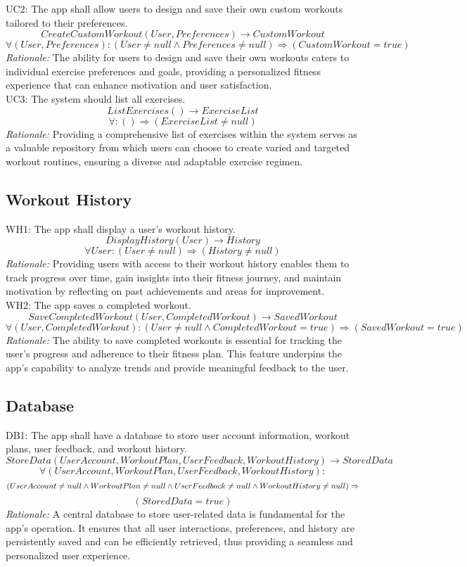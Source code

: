 \documentclass[12pt]{article}
\begin{document}
UC2: The app shall allow users to design and save their own custom workouts tailored to their preferences.
\[CreateCustomWorkout(User, Preferences) \rightarrow CustomWorkout \]
\[ \forall (User, Preferences):(User \neq null \land Preferences \neq null) \Rightarrow (CustomWorkout = true) \]
\textit{Rationale:} The ability for users to design and save their own workouts caters to individual exercise preferences and goals, providing a personalized fitness experience that can enhance motivation and user satisfaction.
\\

UC3: The system should list all exercises.
\[ListExercises() \rightarrow ExerciseList \]
\[ \forall : () \Rightarrow (ExerciseList \neq null) \]
\textit{Rationale:} Providing a comprehensive list of exercises within the system serves as a valuable repository from which users can choose to create varied and targeted workout routines, ensuring a diverse and adaptable exercise regimen.

\subsection{Workout History}
WH1: The app shall display a user’s workout history.
\[DisplayHistory(User) \rightarrow History \]
\[ \forall User: (User \neq null) \Rightarrow (History \neq null) \]
\textit{Rationale:} Providing users with access to their workout history enables them to track progress over time, gain insights into their fitness journey, and maintain motivation by reflecting on past achievements and areas for improvement.
\\

WH2: The app saves a completed workout.
\[SaveCompletedWorkout(User, CompletedWorkout) \rightarrow SavedWorkout \]
\[ \forall (User, CompletedWorkout): (User \neq null \land CompletedWorkout = true) \Rightarrow (SavedWorkout = true) \]
\textit{Rationale:} The ability to save completed workouts is essential for tracking the user’s progress and adherence to their fitness plan. This feature underpins the app's capability to analyze trends and provide meaningful feedback to the user.

\subsection{Database}
DB1: The app shall have a database to store user account information, workout plans, user feedback, and workout history.
\[StoreData(UserAccount, WorkoutPlan, UserFeedback, WorkoutHistory) \rightarrow StoredData \]
\[ \forall (UserAccount, WorkoutPlan, UserFeedback, WorkoutHistory):\] 
\[(UserAccount \neq null \land WorkoutPlan \neq null \land UserFeedback \neq null \land WorkoutHistory \neq null) \\
\Rightarrow\] \[(StoredData = true) \]
\textit{Rationale:} A central database to store user-related data is fundamental for the app's operation. It ensures that all user interactions, preferences, and history are persistently saved and can be efficiently retrieved, thus providing a seamless and personalized user experience.
\end{document}
